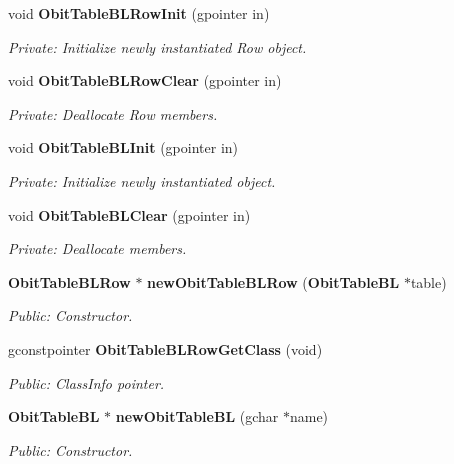 \begin{CompactItemize}
\item 
void {\bf Obit\-Table\-BLRow\-Init} (gpointer in)
\begin{CompactList}\small\item\em Private: Initialize newly instantiated Row object. \item\end{CompactList}\item 
void {\bf Obit\-Table\-BLRow\-Clear} (gpointer in)
\begin{CompactList}\small\item\em Private: Deallocate Row members. \item\end{CompactList}\item 
void {\bf Obit\-Table\-BLInit} (gpointer in)
\begin{CompactList}\small\item\em Private: Initialize newly instantiated object. \item\end{CompactList}\item 
void {\bf Obit\-Table\-BLClear} (gpointer in)
\begin{CompactList}\small\item\em Private: Deallocate members. \item\end{CompactList}\item 
{\bf Obit\-Table\-BLRow} $\ast$ {\bf new\-Obit\-Table\-BLRow} ({\bf Obit\-Table\-BL} $\ast$table)
\begin{CompactList}\small\item\em Public: Constructor. \item\end{CompactList}\item 
gconstpointer {\bf Obit\-Table\-BLRow\-Get\-Class} (void)
\begin{CompactList}\small\item\em Public: Class\-Info pointer. \item\end{CompactList}\item 
{\bf Obit\-Table\-BL} $\ast$ {\bf new\-Obit\-Table\-BL} (gchar $\ast$name)
\begin{CompactList}\small\item\em Public: Constructor. \item\end{CompactList}\item 

\end{CompactItemize}
